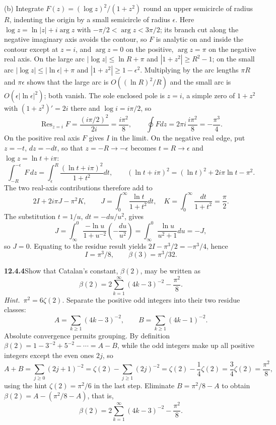 (b) Integrate $F(z)=(\log z)^2/(1+z^2)$ round an upper
semicircle of radius $R$, indenting the origin by a small semicircle of
radius $\epsilon$. Here $\log z=\ln|z|+i\arg z$ with
$-\pi/2<\arg z<3\pi/2$; its branch cut along the negative imaginary axis
avoids the contour, so $F$ is analytic on and inside the contour except
at $z=i$, and $\arg z=0$ on the positive, $\arg z=\pi$ on the negative
real axis.
On the large arc $|\log z|\le\ln R+\pi$ and
$|1+z^2|\ge R^2-1$; on the small arc $|\log z|\le
|\ln\epsilon|+\pi$ and $|1+z^2|\ge1-\epsilon^2$. Multiplying by the arc
lengths $\pi R$ and $\pi\epsilon$ shows that the large arc is
$O((\ln R)^2/R)$ and the small arc is
$O(\epsilon|\ln\epsilon|^2)$; both vanish. The sole enclosed pole is
$z=i$, a simple zero of $1+z^2$ with $(1+z^2)'=2i$ there and
$\log i=i\pi/2$, so
\[
\operatorname{Res}_{z=i}F
=\frac{(i\pi/2)^2}{2i}=\frac{i\pi^2}{8},\qquad
\oint Fdz=2\pi i\,\frac{i\pi^2}{8}=-\frac{\pi^3}{4}.
\]
On the positive real axis $F$ gives $I$ in the limit. On the negative
real edge, put $z=-t$, $dz=-dt$, so that $z=-R\to-\epsilon$ becomes
$t=R\to\epsilon$ and $\log z=\ln t+i\pi$:
\[
\int_{-R}^{-\epsilon}F\,dz
=\int_\epsilon^R\frac{(\ln t+i\pi)^2}{1+t^2}dt,\qquad
(\ln t+i\pi)^2=(\ln t)^2+2i\pi\ln t-\pi^2.
\]
The two real-axis contributions therefore add to
\[
2I+2i\pi J-\pi^2K,\qquad
J=\int_0^\infty\frac{\ln t}{1+t^2}dt,\quad
K=\int_0^\infty\frac{dt}{1+t^2}=\frac\pi2.
\]
The substitution $t=1/u$, $dt=-du/u^2$, gives
\[
J=\int_\infty^0\frac{-\ln u}{1+u^{-2}}\left(-\frac{du}{u^2}\right)
=\int_\infty^0\frac{\ln u}{u^2+1}du=-J,
\]
so $J=0$. Equating to the
residue result yields $2I-\pi^3/2=-\pi^3/4$, hence
\[
\boxed{I=\pi^3/8},\qquad \boxed{\beta(3)=\pi^3/32}.
\]

\par\bigskip
\noindent\textbf{12.4.4}\quad Show that Catalan's constant, $\beta(2)$, may be
written as
\[
\beta(2)=2\sum_{k=1}^{\infty}(4k-3)^{-2}-\frac{\pi^{2}}{8}.
\]
\emph{Hint.}~$\pi^{2}=6\zeta(2)$.
\solution
Separate the positive odd integers into their two residue classes:
\[
A=\sum_{k\ge1}(4k-3)^{-2},\qquad
B=\sum_{k\ge1}(4k-1)^{-2}.
\]
Absolute convergence permits grouping. By definition
$\beta(2)=1-3^{-2}+5^{-2}-\cdots=A-B$, while the odd integers make up
all positive integers except the even ones $2j$, so
\[
A+B=\sum_{j\ge0}(2j+1)^{-2}
=\zeta(2)-\sum_{j\ge1}(2j)^{-2}
=\zeta(2)-\frac14\zeta(2)
=\frac34\zeta(2)=\frac{\pi^2}{8},
\]
using the hint $\zeta(2)=\pi^2/6$ in the last step.
Eliminate $B=\pi^2/8-A$ to obtain $\beta(2)=A-(\pi^2/8-A)$, that is,
\[
\boxed{\beta(2)=2\sum_{k=1}^\infty(4k-3)^{-2}-\frac{\pi^2}{8}}.
\]

